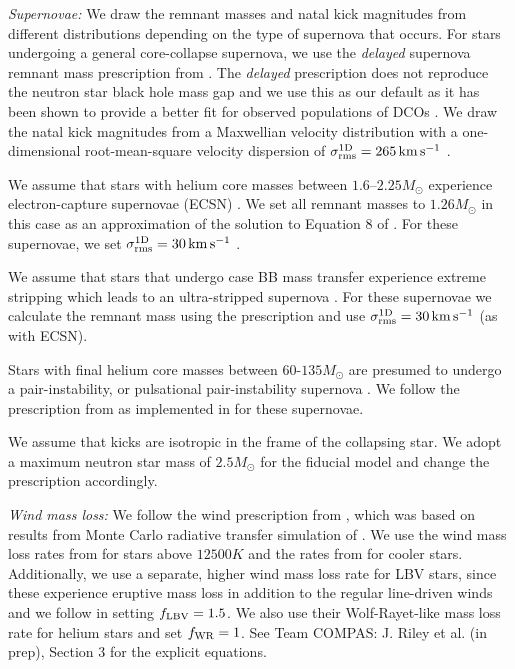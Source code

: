 \textit{Supernovae:} We draw the remnant masses and natal kick magnitudes from different distributions depending on the type of supernova that occurs. For stars undergoing a general core-collapse supernova, we use the \textit{delayed} supernova remnant mass prescription from \citet{Fryer+2012}. The \textit{delayed} prescription does not reproduce the neutron star black hole mass gap and we use this as our default as it has been shown to provide a better fit for observed populations of DCOs \citep[e.g.][]{Vigna-Gomez+2018}. We draw the natal kick magnitudes from a Maxwellian velocity distribution with a one-dimensional root-mean-square velocity dispersion of $\sigma_{\rm rms}^{\rm 1D} = 265 \unit{km}{s^{-1}}$ \citep{Lyne+1994, Hobbs+2005}.

We assume that stars with helium core masses between $1.6$--$2.25 \unit{M_{\odot}}$ \citep{Hurley+2002} experience electron-capture supernovae (ECSN) \citep{Nomoto+1984, Nomoto+1987, Ivanova+2008}. We set all remnant masses to $1.26 \unit{M_{\odot}}$ in this case as an approximation of the solution to Equation 8 of \citet{Timmes+1996}. For these supernovae, we set $\sigma_{\rm rms}^{\rm 1D} = 30 \unit{km}{s^{-1}}$ \citep[e.g.][]{Pfahl+2002, Podsiadlowski+2004}.

We assume that stars that undergo case BB mass transfer \citep{Dewi+2002} experience extreme stripping which leads to an ultra-stripped supernova \citep{Tauris+2013, Tauris+2015}. For these supernovae we calculate the remnant mass using the \citet{Fryer+2012} prescription and use $\sigma_{\rm rms}^{\rm 1D} = 30 \unit{km}{s^{-1}}$ (as with ECSN).

Stars with final helium core masses between $60$-$135 \unit{M_{\odot}}$ are presumed to undergo a pair-instability, or pulsational pair-instability supernova \citep[e.g.][]{Woosley+2007, Farmer+2019}. We follow the prescription from \citet{Marchant+2019} as implemented in \citep{Stevenson+2019} for these supernovae.

We assume that kicks are isotropic in the frame of the collapsing star. We adopt a maximum neutron star mass of $2.5 \unit{M_{\odot}}$ \citep[e.g.][]{Kalogera+1996, Fryer+2015, Margalit+2017} for the fiducial model and change the \citet{Fryer+2012} prescription accordingly.

\textit{Wind mass loss:} We follow the wind prescription from \citet{Belczynski+2008}, which was based on results from Monte Carlo radiative transfer simulation of \citet{Vink+2000, Vink+2001}. We use the wind mass loss rates from \citet{Vink+2001} for stars above $12500 \unit{K}$ and the rates from \citet{Hurley+2000} for cooler stars. Additionally, we use a separate, higher wind mass loss rate for LBV stars, since these experience eruptive mass loss in addition to the regular line-driven winds and we follow \citet{Belczynski+2008} in setting $f_{\rm LBV} = 1.5$. We also use their Wolf-Rayet-like mass loss rate for helium stars and set $f_{\rm WR} = 1$. See Team COMPAS: J. Riley et al. (in prep), Section 3 for the explicit equations.

